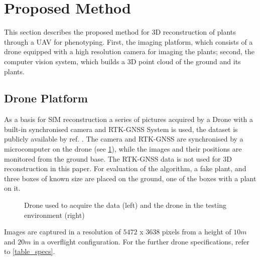\documentclass[conference,]{IEEEtran}
\begin{document}
\hypertarget{proposed-method}{%
\section{Proposed Method}\label{proposed-method}}

This section describes the proposed method for 3D reconstruction of
plants through a UAV for phenotyping. First, the imaging platform, which
consists of a drone equipped with a high resolution camera for imaging
the plants; second, the computer vision system, which builds a 3D point
cloud of the ground and its plants.

\hypertarget{sec-drone}{%
\subsection{Drone Platform}\label{sec-drone}}

As a basis for SfM reconstruction a series of pictures acquired by a
Drone with a built-in synchronised camera and RTK-GNSS System is used,
the dataset is publicly available by ref. \autocite{matsuura2023}. The
camera and RTK-GNSS are synchronised by a microcomputer on the drone
(see \cref{fig-DroneSetup}), while the images and their positions are
monitored from the ground base. The RTK-GNSS data is not used for 3D
reconstruction in this paper. For evaluation of the algorithm, a fake
plant, and three boxes of known size are placed on the ground, one of
the boxes with a plant on it. \autocite{matsuura2023}

\begin{figure}[tp]
\centering
{}
\hfil
{}
\caption{Drone used to acquire the data (left) and the drone in the testing environment (right) \autocite{matsuura2023}}
\label{fig-DroneSetup}
\end{figure}

Images are captured in a resolution of \(5472\) x \(3638\) pixels from a
height of \(10m\) and \(20m\) in a overflight configuration. For the
further drone specifications, refer to \cref{table_specs}.
\autocite{matsuura2023}
\end{document}
